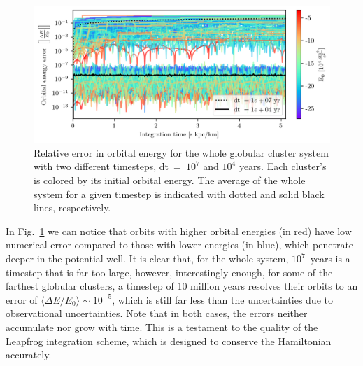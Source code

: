         \begin{figure}
            \centering
            \includegraphics[width=\linewidth]{images/numericalErrorLeapfrogVanilla.png}
            \caption[Relative orbital energy error for the globular cluster system]{Relative error in orbital energy for the whole globular cluster system with two different timesteps, dt~=~$10^{7}$ and $10^{4}$ years. Each cluster's is colored by its initial orbital energy. The average of the whole system for a given timestep is indicated with dotted and solid black lines, respectively.}
            \label{fig:numericalErrorLeapfrogVanilla}
        \end{figure}
        In Fig.~\ref{fig:numericalErrorLeapfrogVanilla} we can notice that orbits with higher orbital energies (in red) have low numerical error compared to those with lower energies (in blue),  which penetrate deeper in the potential well. It is clear that, for the whole system, $10^7$~years is a timestep that is far too large, however, interestingly enough, for some of the farthest globular clusters, a timestep of 10 million years resolves their orbits to an error of $\langle \Delta E / E_0 \rangle \sim 10^{-5}$, which is still far less than the uncertainties due to observational uncertainties. Note that in both cases, the errors neither accumulate nor grow with time. This is a testament to the quality of the Leapfrog integration scheme, which is designed to conserve the Hamiltonian accurately.

